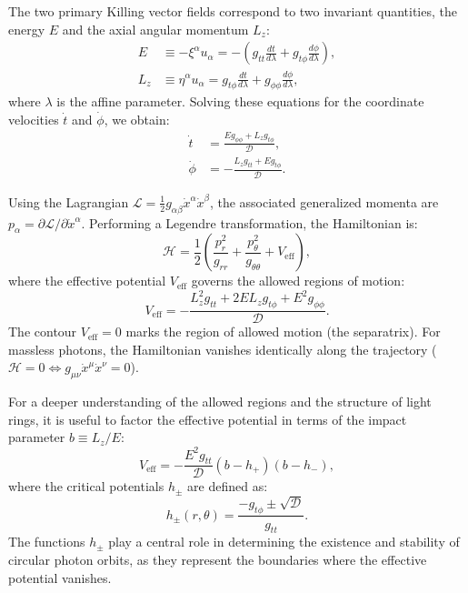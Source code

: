 \documentclass[11pt]{book}
\begin{document}
The two primary Killing vector fields correspond to two invariant quantities, the energy \(E\) and the axial angular momentum \(L_z\):
\begin{align}
    E &\equiv -\xi^\alpha u_\alpha = -\left(g_{tt}\frac{dt}{d\lambda} + g_{t\phi}\frac{d\phi}{d\lambda}\right), \\
    L_z &\equiv \eta^\alpha u_\alpha = g_{t\phi}\frac{dt}{d\lambda} + g_{\phi\phi}\frac{d\phi}{d\lambda},
\end{align}
where $\lambda$ is the affine parameter. Solving these equations for the coordinate velocities $\dot{t}$ and $\dot{\phi}$, we obtain:
\begin{align}
    \dot{t} &= \frac{E g_{\phi\phi} + L_z g_{t\phi}}{\mathcal{D}}, \\
    \dot{\phi} &= -\frac{L_z g_{tt} + E g_{t\phi}}{\mathcal{D}}.
\end{align}

Using the Lagrangian $\mathcal{L} = \frac{1}{2} g_{\alpha\beta} \dot{x}^\alpha \dot{x}^\beta$, the associated generalized momenta are $p_\alpha = \partial\mathcal{L} / \partial\dot{x}^\alpha$. Performing a Legendre transformation, the Hamiltonian is:
\begin{equation}
    \mathcal{H} = \frac{1}{2} \left( \frac{p_r^2}{g_{rr}} + \frac{p_\theta^2}{g_{\theta\theta}} + V_{\text{eff}} \right),
\end{equation}
where the effective potential $V_{\text{eff}}$ governs the allowed regions of motion:
\begin{equation}
    V_{\text{eff}} = -\frac{L_z^2 g_{tt} + 2 E L_z g_{t\phi} + E^2 g_{\phi\phi}}{\mathcal{D}}.
\end{equation}
The contour $V_{\text{eff}} = 0$ marks the region of allowed motion (the separatrix). For massless photons, the Hamiltonian vanishes identically along the trajectory ($\mathcal{H} = 0 \iff g_{\mu\nu} \dot{x}^\mu \dot{x}^\nu = 0$).

For a deeper understanding of the allowed regions and the structure of light rings, it is useful to factor the effective potential in terms of the impact parameter $b \equiv L_z / E$:
\begin{equation}
    V_{\text{eff}} = -\frac{E^2 g_{tt}}{\mathcal{D}} (b - h_+)(b - h_-),
\end{equation}
where the critical potentials \(h_{\pm}\) are defined as:
\begin{equation}
    h_{\pm}(r, \theta) = \frac{-g_{t\phi} \pm \sqrt{\mathcal{D}}}{g_{tt}}.
\end{equation}
The functions \(h_{\pm}\) play a central role in determining the existence and stability of circular photon orbits, as they represent the boundaries where the effective potential vanishes.
\end{document}
